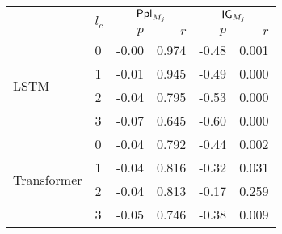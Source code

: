 \begin{tabular}{llrrrr}
\toprule
    & \multirow{2}{*}{$l_c$} & \multicolumn{2}{c}{$\mathsf{Ppl}_{M_j}$} & \multicolumn{2}{c}{$\mathsf{IG}_{M_j}$} \\
                              &       &         $p$ &            $r$ &           $p$ &          $r$ \\
\midrule
\multirow{4}{*}{LSTM}         & 0 &        -0.00 &          0.974 &         -0.48 &         0.001 \\
                              & 1 &        -0.01 &          0.945 &         -0.49 &         0.000 \\
                              & 2 &        -0.04 &          0.795 &         -0.53 &         0.000 \\
                              & 3 &        -0.07 &          0.645 &         -0.60 &         0.000 \\
\midrule
\multirow{4}{*}{Transformer}  & 0 &        -0.04 &          0.792 &         -0.44 &         0.002 \\
                              & 1 &        -0.04 &          0.816 &         -0.32 &         0.031 \\
                              & 2 &        -0.04 &          0.813 &         -0.17 &         0.259 \\
                              & 3 &        -0.05 &          0.746 &         -0.38 &         0.009 \\
\bottomrule
\end{tabular}

